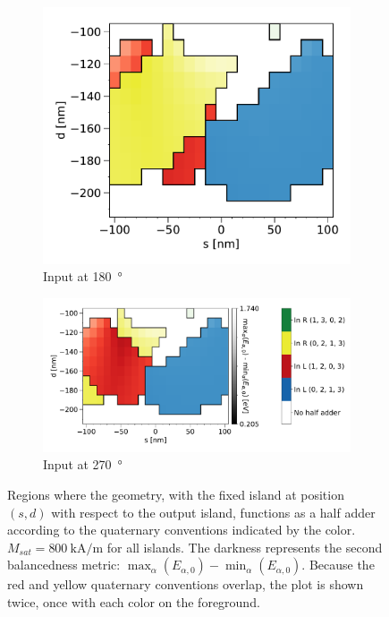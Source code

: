 \documentclass[11pt,a4paper,english]{article}
\begin{document}
\begin{figure}
\centering
\begin{subfigure}[t]{0.37\textwidth}
    \includegraphics[width=\textwidth]{Figures/half_adder/sweep/000006_d-s/table(d100-210_10,s-100-100_10)_balanced2_reversedForeground.pdf}
    \caption{Input at \SI{180}{\degree}}
\end{subfigure}
\begin{subfigure}[t]{0.62\textwidth}
    \includegraphics[width=\textwidth]{Figures/half_adder/sweep/000006_d-s/table(d100-210_10,s-100-100_10)_balanced2.pdf}
    \caption{Input at \SI{270}{\degree}}
\end{subfigure}
\caption{Regions where the geometry, with the fixed island at position $(s, d)$ with respect to the output island, functions as a half adder according to the quaternary conventions indicated by the color. $M_{sat} = \SI{800}{\kilo\ampere\per\metre}$ for all islands. The darkness represents the second balancedness metric: $\max_\alpha(E_{\alpha,0}) - \min_\alpha(E_{\alpha,0})$. Because the red and yellow quaternary conventions overlap, the plot is shown twice, once with each color on the foreground.} 
\label{fig:HalfAdder_000006_sweep_d-s_balanced2}
\end{figure}
\end{document}
